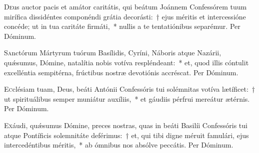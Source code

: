 \documentclass[vesperale_romanum.tex]{subfiles}
\begin{document}
\oratio
\lettrine{D}{e}us auctor pacis et amátor caritátis, qui beátum Joánnem Confessórem tuum mirífica dissidéntes componéndi grátia decorásti:~† ejus méritis et intercessióne concéde; ut in tua caritáte firmáti,~* nullis a te tentatiónibus separémur. Per Dóminum.


\oratio
\lettrine{S}{a}nctórum Mártyrum tuórum Basílidis, Cyríni, Náboris atque Nazárii, quǽsumus, Dómine, natalítia nobis votíva respléndeant:~* et, quod illis cóntulit excelléntia sempitérna, frúctibus nostræ devotiónis accréscat. Per Dóminum.

\capitdeseq

\myrule
\newpage



\duplex

\similabo


\oratio

\lettrine{E}{c}clésiam tuam, Deus, beáti Antónii Confessóris tui solémnitas votíva lætíficet:~† ut spirituálibus semper muniátur auxíliis,~* et gáudiis pérfrui mereátur ætérnis. Per Dóminum.

\capitdeseq

\myrule



\duplexmtv

\odoctoroptime

\oratio

\lettrine{E}{x}áudi, quǽsumus Dómine, preces nostras, quas in beáti Basilíi Confessóris tui atque Pontíficis solemnitáte deférimus:~† et, qui tibi digne méruit famulári, ejus intercedéntibus méritis,~* ab ómnibus nos absólve peccátis. Per Dóminum.
\end{document}
